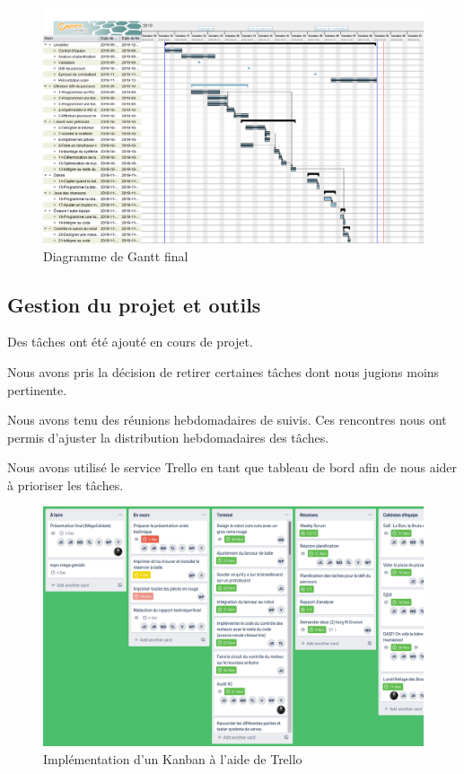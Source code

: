 \begin{figure}[h!]
    \centering
    \includegraphics[width=\linewidth]{img/s1/robuck-2019-12-06.png}
    \caption{Diagramme de Gantt final}
    \label{fig:planif-final}
\end{figure}

\subsection{Gestion du projet et outils}


Des tâches ont été ajouté en cours de projet.

Nous avons pris la décision de retirer certaines tâches dont nous jugions moins pertinente.



Nous avons tenu des réunions hebdomadaires de suivis.
Ces rencontres nous ont permis d'ajuster la distribution hebdomadaires des tâches.

Nous avons utilisé le service Trello en tant que tableau de bord afin de nous aider à prioriser les tâches.

\begin{figure}[h!]
    \centering
    \includegraphics[width=\linewidth]{img/s1/trello}
    \caption{Implémentation d'un Kanban à l'aide de Trello}
    \label{fig:planif-trello}
\end{figure}
